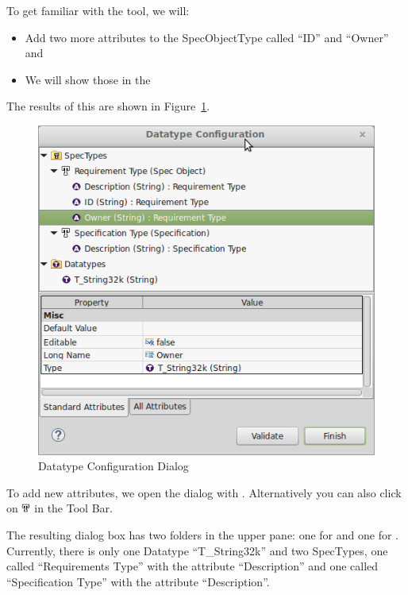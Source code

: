 To get familiar with the tool, we will:

\begin{itemize}
\item
  Add two more attributes to the SpecObjectType called ``ID'' and ``Owner'' and
\item
  We will show those  in the 
\end{itemize}

The results of this are shown in Figure~\ref{fig:datatype_configuration}.

\begin{figure}
\centering
\includegraphics[width=0.8\linewidth]{../rmf-images/datatype.png}
\caption{Datatype Configuration Dialog}
\label{fig:datatype_configuration}
\end{figure}

To add new attributes, we open the  dialog with .  Alternatively you can also click on \includegraphics[height=0.8em]{../rmf-images/icons/full/obj16/SpecType.png} in the Tool Bar.

The resulting dialog box has two folders in the upper pane: one for  and one for .  Currently, there is only one Datatype ``T\_String32k'' and two SpecTypes, one called ``Requirements Type'' with the attribute ``Description'' and one called ``Specification Type'' with the attribute ``Description''.

